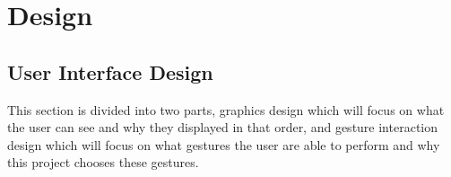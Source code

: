 
\chapter{Design} %

\label{Chapter5} %

\section{User Interface Design}
This section is divided into two parts, graphics design which will focus on what the user can see and why they displayed in that order, and gesture interaction design which will focus on what gestures the user are able to perform and why this project chooses these gestures.
